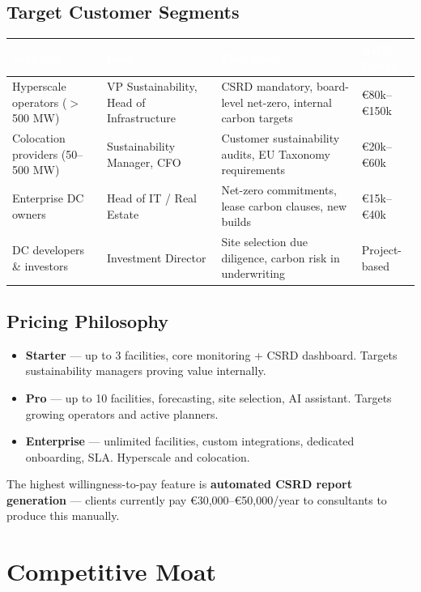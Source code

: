 \documentclass[11pt, a4paper]{article}
\newcommand{\tableheader}[1]{\cellcolor{flaergreen!90}\textcolor{white}{\textbf{\small #1}}}
\begin{document}
\subsection{Target Customer Segments}

\begin{tabular}{p{3cm} p{3.2cm} p{4cm} p{2.5cm}}
  \toprule
  \tableheader{Segment} & \tableheader{Role} & \tableheader{Pain Point} & \tableheader{ARR Range} \\
  \midrule
  Hyperscale operators ($>$500 MW) & VP Sustainability, Head of Infrastructure & CSRD mandatory, board-level net-zero, internal carbon targets & €80k--€150k \\
  \rowcolor{rowalt}
  Colocation providers (50--500 MW) & Sustainability Manager, CFO & Customer sustainability audits, EU Taxonomy requirements & €20k--€60k \\
  Enterprise DC owners & Head of IT / Real Estate & Net-zero commitments, lease carbon clauses, new builds & €15k--€40k \\
  \rowcolor{rowalt}
  DC developers \& investors & Investment Director & Site selection due diligence, carbon risk in underwriting & Project-based \\
  \bottomrule
\end{tabular}

\subsection{Pricing Philosophy}

\begin{itemize}[leftmargin=1.4em]
  \item \textbf{Starter} — up to 3 facilities, core monitoring + CSRD dashboard. Targets sustainability managers proving value internally.
  \item \textbf{Pro} — up to 10 facilities, forecasting, site selection, AI assistant. Targets growing operators and active planners.
  \item \textbf{Enterprise} — unlimited facilities, custom integrations, dedicated onboarding, SLA. Hyperscale and colocation.
\end{itemize}

The highest willingness-to-pay feature is \textbf{automated CSRD report generation} — clients currently pay €30,000--€50,000/year to consultants to produce this manually.

\section{Competitive Moat}
\end{document}
